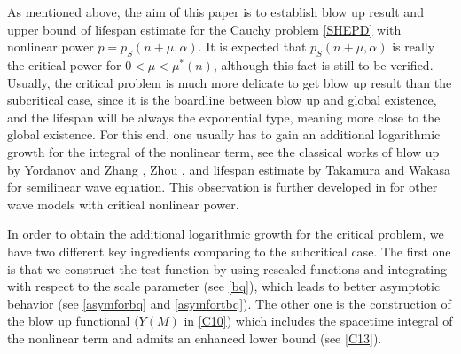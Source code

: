 \documentclass[review]{elsarticle}
\begin{document}
As mentioned above, the aim of this paper is to establish blow up result and upper bound of lifespan estimate for the Cauchy problem \eqref{SHEPD} with nonlinear power $p=p_S(n+\mu, \alpha)$. It is expected that $p_S(n+\mu, \alpha)$ is really the critical power for $0<\mu<\mu^*(n)$, although this fact is still to be verified. Usually, the critical problem is much more delicate to get blow up result than the subcritical case, since it is the boardline between blow up and global existence, and the lifespan will be always the exponential type, meaning more close to the global existence. For this end, one usually has to gain an additional logarithmic growth for the integral of the nonlinear term, see the classical works of blow up by Yordanov and Zhang \cite{YZ06}, Zhou \cite{Zhou07}, and lifespan estimate by Takamura and Wakasa \cite{TW11} for semilinear wave equation. This observation is further developed in \cite{TuL19,PT22,LZ23,LPT24} for other wave models with critical nonlinear power.

In order to obtain the additional logarithmic growth for the critical problem, we have two different key ingredients comparing to the subcritical case. The first one is that we construct the test function by using rescaled functions and integrating with respect to the scale parameter (see \eqref{bq}), which leads to better asymptotic behavior (see \eqref{asymforbq} and \eqref{asymfortbq}). The other one is the construction of the blow up functional ($Y(M)$ in \eqref{C10}) which includes the spacetime integral of the nonlinear term and admits an enhanced lower bound (see \eqref{C13}).
\end{document}

